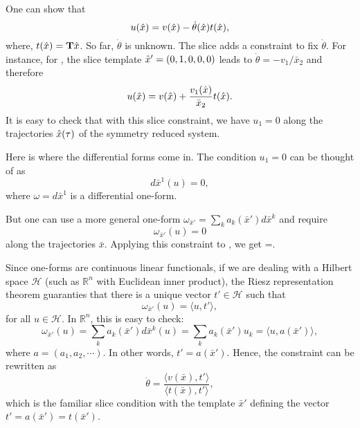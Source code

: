 \begin{description}
{One can show that
\begin{equation}
u(\hat{x})=v(\hat{x})-\dot \theta(\hat{x}) t(\hat{x}),
\label{eq:slice_vf}
\end{equation}
where, $t(\hat{x})=\mathbf T\hat{x}$. So far, $\dot \theta$ is unknown. The
slice adds a constraint to fix $\dot{\theta}$. For instance, for {\cLe},
the slice template $\hat{x}'=(0,1,0,0,0)$ leads to $\dot{\theta}=-v_1/\bar
x_2$ and therefore
$$u(\hat{x})=v(\hat{x})+\frac{v_1(\hat{x})}{\bar x_2}t(\hat{x}).$$
It is easy to check that with this slice constraint, we have $u_1=0$ along the trajectories $\hat{x}(\tau)$ of the symmetry reduced system.

Here is where the differential forms come in. The condition $u_1=0$ can be thought of as $$d\bar x^1(u)=0,$$ where $\omega=d\bar x^1$ is a differential one-form.

But one can use a more general one-form $\omega_{\bar x'} = \sum_k a_k(\bar x')d\bar x^k$ and require
$$\omega_{\bar x'}(u)=0$$
along the trajectories $\bar x$. Applying this constraint to , we get
\beq
\dot\theta=.
\label{eq:const_form}
\eeq

Since one-forms are continuous linear functionals, if we are dealing with a Hilbert space $\mathcal H$ (such as $\mathbb R^n$ with Euclidean inner product), the Riesz representation theorem guaranties that there is a unique vector $t'\in\mathcal H$ such that
$$\omega_{\bar x'} (u)= \langle u,t'\rangle,$$
for all $u\in \mathcal H$. In $\mathbb R^n$, this is easy to check:
$$\omega_{\bar x'} (u)=\sum_k a_k(\bar x') d\bar x^k(u)
= \sum_k a_k(\bar x') u_k = \langle u,a(\bar x')\rangle,$$
where $a=(a_1,a_2,\cdots)$. In other words, $t'=a(\bar x')$. Hence, the constraint  can be rewritten as
$$\dot\theta=\frac{\langle v(\bar x),t'\rangle}{\langle t(\bar x),t'\rangle},$$
which is the familiar slice condition with the template $\bar x'$ defining the vector $t'=a(\bar x')=t(\bar x')$.
}

\end{description}
